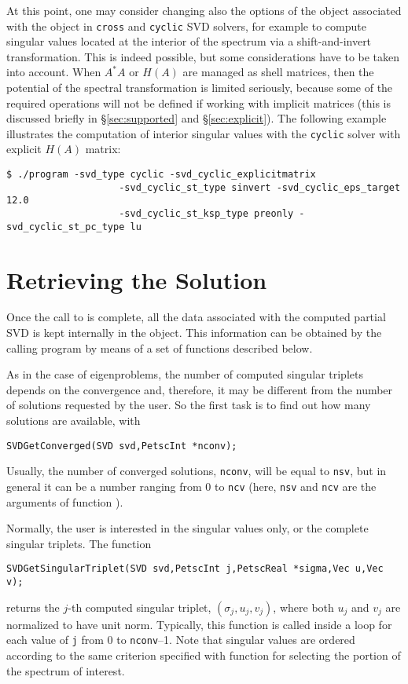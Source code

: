 At this point, one may consider changing also the options of the  object associated with the  object in \texttt{cross} and \texttt{cyclic} SVD solvers, for example to compute singular values located at the interior of the spectrum via a shift-and-invert transformation. This is indeed possible, but some considerations have to be taken into account. When $A^*A$ or $H(A)$ are managed as shell matrices, then the potential of the spectral transformation is limited seriously, because some of the required operations will not be defined if working with implicit matrices (this is discussed briefly in \S\ref{sec:supported} and \S\ref{sec:explicit}). The following example illustrates the computation of interior singular values with the \texttt{cyclic} solver with explicit $H(A)$ matrix:
\begin{Verbatim}[fontsize=\small]
	$ ./program -svd_type cyclic -svd_cyclic_explicitmatrix
                    -svd_cyclic_st_type sinvert -svd_cyclic_eps_target 12.0
                    -svd_cyclic_st_ksp_type preonly -svd_cyclic_st_pc_type lu
\end{Verbatim}

\section{Retrieving the Solution}

Once the call to  is complete, all the data associated with the computed partial SVD is kept internally in the  object. This information can be obtained by the calling program by means of a set of functions described below.

As in the case of eigenproblems, the number of computed singular triplets depends on the convergence and, therefore, it may be different from the number of solutions requested by the user. So the first task is to find out how many solutions are available, with
	\begin{Verbatim}[fontsize=\small]
	SVDGetConverged(SVD svd,PetscInt *nconv);
	\end{Verbatim}
Usually, the number of converged solutions, \texttt{nconv}, will be equal to \texttt{nsv}, but in general it can be a number ranging from 0 to \texttt{ncv} (here, \texttt{nsv} and \texttt{ncv} are the arguments of function ).

Normally, the user is interested in the singular values only, or the complete singular triplets. The function
	\begin{Verbatim}[fontsize=\small]
	SVDGetSingularTriplet(SVD svd,PetscInt j,PetscReal *sigma,Vec u,Vec v);
	\end{Verbatim}
returns the $j$-th computed singular triplet, $(\sigma_j,u_j,v_j)$, where both $u_j$ and $v_j$ are normalized to have unit norm. Typically, this function is called inside a loop for each value of \texttt{j} from 0 to \texttt{nconv}--1. Note that singular values are ordered according to the same criterion specified with function  for selecting the portion of the spectrum of interest.

